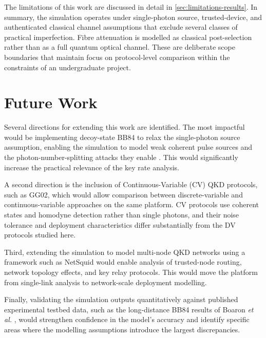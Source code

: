 \documentclass[10pt, a4paper]{report}
\begin{document}
The limitations of this work are discussed in detail in \cref{sec:limitations-results}. In summary, the simulation operates under single-photon source, trusted-device, and authenticated classical channel assumptions that exclude several classes of practical imperfection. Fibre attenuation is modelled as classical post-selection rather than as a full quantum optical channel. These are deliberate scope boundaries that maintain focus on protocol-level comparison within the constraints of an undergraduate project.



\section{Future Work}

Several directions for extending this work are identified. The most impactful would be implementing decoy-state BB84 to relax the single-photon source assumption, enabling the simulation to model weak coherent pulse sources and the photon-number-splitting attacks they enable \cite{Lo2005Decoy}. This would significantly increase the practical relevance of the key rate analysis.

A second direction is the inclusion of Continuous-Variable (CV) QKD protocols, such as GG02, which would allow comparison between discrete-variable and continuous-variable approaches on the same platform. CV protocols use coherent states and homodyne detection rather than single photons, and their noise tolerance and deployment characteristics differ substantially from the DV protocols studied here.

Third, extending the simulation to model multi-node QKD networks using a framework such as NetSquid \cite{NetSquid2021} would enable analysis of trusted-node routing, network topology effects, and key relay protocols. This would move the platform from single-link analysis to network-scale deployment modelling.

Finally, validating the simulation outputs quantitatively against published experimental testbed data, such as the long-distance BB84 results of Boaron \textit{et al.} \cite{Boaron2018}, would strengthen confidence in the model's accuracy and identify specific areas where the modelling assumptions introduce the largest discrepancies.
\end{document}
